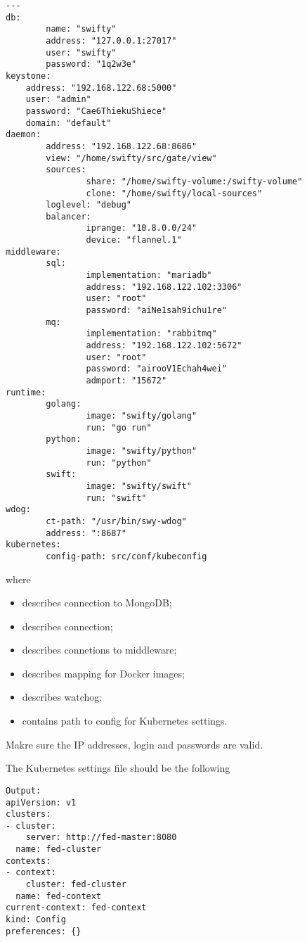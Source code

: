 \begin{lstlisting}
---
db:
        name: "swifty"
        address: "127.0.0.1:27017"
        user: "swifty"
        password: "1q2w3e"
keystone:
	address: "192.168.122.68:5000"
	user: "admin"
	password: "Cae6ThiekuShiece"
	domain: "default"
daemon:
        address: "192.168.122.68:8686"
        view: "/home/swifty/src/gate/view"
        sources:
                share: "/home/swifty-volume:/swifty-volume"
                clone: "/home/swifty/local-sources"
        loglevel: "debug"
        balancer:
                iprange: "10.8.0.0/24"
                device: "flannel.1"
middleware:
        sql:
                implementation: "mariadb"
                address: "192.168.122.102:3306"
                user: "root"
                password: "aiNe1sah9ichu1re"
        mq:
                implementation: "rabbitmq"
                address: "192.168.122.102:5672"
                user: "root"
                password: "airooV1Echah4wei"
                admport: "15672"
runtime:
        golang:
                image: "swifty/golang"
                run: "go run"
        python:
                image: "swifty/python"
                run: "python"
        swift:
                image: "swifty/swift"
                run: "swift"
wdog:
        ct-path: "/usr/bin/swy-wdog"
        address: ":8687"
kubernetes:
        config-path: src/conf/kubeconfig
\end{lstlisting}

where
\begin{itemize}
\item{ describes connection to MongoDB;}
\item{ describes  connection;}
\item{ describes connetions to middleware;}
\item{ describes mapping for Docker images;}
\item{ describes  watchog;}
\item{ contains path to config for Kubernetes settings.}
\end{itemize}

Makre sure the IP addresses, login and passwords are valid.

The Kubernetes settings file should be the following

\begin{lstlisting}
Output:
apiVersion: v1
clusters:
- cluster:
    server: http://fed-master:8080
  name: fed-cluster
contexts:
- context:
    cluster: fed-cluster
  name: fed-context
current-context: fed-context
kind: Config
preferences: {}
\end{lstlisting}

